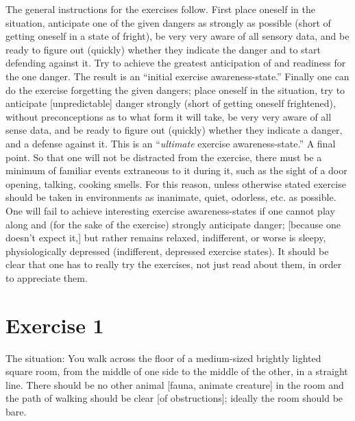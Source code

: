 The general instructions for the exercises follow. First place oneself in the 
situation, anticipate one of the given dangers as strongly as possible (short 
of getting oneself in a state of fright), be very very aware of all sensory data, 
and be ready to figure out (quickly) whether they indicate the danger and to 
start defending against it. Try to achieve the greatest anticipation of and 
readiness for the one danger. The result is an \enquote{initial exercise awareness-state.} Finally one can do the exercise forgetting the given dangers; place 
oneself in the situation, try to anticipate [unpredictable] danger strongly 
(short of getting oneself frightened), without preconceptions as to what form 
it will take, be very very aware of all sense data, and be ready to figure out 
(quickly) whether they indicate a danger, and a defense against it. This is 
an \enquote{\emph{ultimate} exercise awareness-state.} A final point. So that one will not be 
distracted from the exercise, there must be a minimum of familiar events 
extraneous to it during it, such as the sight of a door opening, talking, 
cooking smells. For this reason, unless otherwise stated exercise should be 
taken in environments as inanimate, quiet, odorless, etc. as possible. One 
will fail to achieve interesting exercise awareness-states if one cannot play 
along and (for the sake of the exercise) strongly anticipate danger; [because 
one doesn't expect it,] but rather remains relaxed, indifferent, or worse is 
sleepy, physiologically depressed (indifferent, depressed exercise states). 
It should be clear that one has to really try the exercises, not just read about 
them, in order to appreciate them. 

\section*{Exercise 1}

The situation: You walk across the floor of a medium-sized brightly lighted 
square room, from the middle of one side to the middle of the other, in a 
straight line. There should be no other animal [fauna, animate creature] in 
the room and the path of walking should be clear [of obstructions]; ideally 
the room should be bare. 

